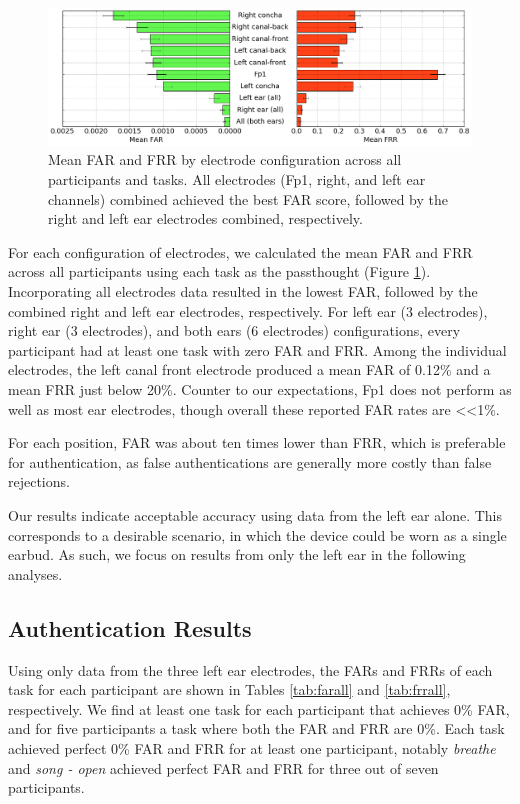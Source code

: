 \documentclass[a4paper,twoside]{article}
\begin{document}
\begin{figure}
\centering
\includegraphics[width=.9\linewidth]{./figures/mean-far-and-frr-by-electrode-config.png}
\caption{Mean FAR and FRR by electrode configuration across all participants and tasks. All electrodes (Fp1, right, and left ear channels) combined achieved the best FAR score, followed by the right and left ear electrodes combined, respectively.}
\label{fig:meanByElectrode}
\end{figure}

\noindent For each configuration of electrodes, we calculated the mean FAR and FRR across all participants using each task as the passthought (Figure \ref{fig:meanByElectrode}). Incorporating all electrodes data resulted in the lowest FAR, followed by the combined right and left ear electrodes, respectively. For left ear (3 electrodes), right ear (3 electrodes), and both ears (6 electrodes) configurations, every participant had at least one task with zero FAR and FRR. Among the individual electrodes, the left canal front electrode produced a mean FAR of 0.12\% and a mean FRR just below 20\%. Counter to our expectations, Fp1 does not perform as well as most ear electrodes, though overall these reported FAR rates are \textless\textless 1\%. 

For each position, FAR was about ten times lower than FRR, which is preferable for authentication, as false authentications are generally more costly than false rejections.

Our results indicate acceptable accuracy using data from the left ear alone. This corresponds to a desirable scenario, in which the device could be worn as a single earbud. As such, we focus on results from only the left ear in the following analyses.

\subsection{Authentication Results}

\noindent Using only data from the three left ear electrodes, the FARs and FRRs of each task for each participant are shown in Tables \ref{tab:farall} and \ref{tab:frrall}, respectively. We find at least one task for each participant that achieves 0\% FAR, and for five participants a task where both the FAR and FRR are 0\%. Each task achieved perfect 0\% FAR and FRR for at least one participant, notably \textit{breathe} and \textit{song - open} achieved perfect FAR and FRR for three out of seven participants.
\end{document}

